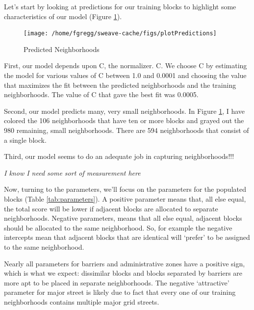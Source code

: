 \documentclass[12pt,letter]{article}\usepackage[]{graphicx}\usepackage[]{color}
\newenvironment{knitrout}{}{} %
\begin{document}
Let’s start by looking at predictions for our training blocks to
highlight some characteristics of our model (Figure
\ref{fig:predictTraining}).

\begin{figure}
\begin{knitrout}
\color{fgcolor}

{\centering \texttt{[image: /home/fgregg/sweave-cache/figs/plotPredictions]} 

}



\end{knitrout}

\caption{Predicted Neighborhoods}
\label{fig:predictTraining}
\end{figure}

First, our model depends upon C, the normalizer.  C. We choose C by
estimating the model for various values of C between 1.0 and 0.0001
and choosing the value that maximizes the fit between the predicted
neighborhoods and the training neighborhoods. The value of C that gave
the best fit was 0.0005.

Second, our model predicts many, very small neighborhoods. In Figure
\ref{fig:predictTraining}, I have colored the
106 neighborhoods that have ten or more
blocks and grayed out the 980 remaining,
small neighborhoods. There are 594
neighborhoods that consist of a single block.

Third, our model seems to do an adequate job in capturing neighborhoods!!!

\emph{I know I need some sort of measurement here}

Now, turning to the parameters, we'll focus on the parameters for the
populated blocks (Table \ref{tab:parameters}). A positive parameter
means that, all else equal, the total score will be lower if adjacent
blocks are allocated to separate neighborhoods. Negative parameters,
means that all else equal, adjacent blocks should be allocated to the
same neighborhood. So, for example the negative intercepts mean that
adjacent blocks that are identical will ‘prefer’ to be assigned to the
same neighborhood.

Nearly all parameters for barriers and administrative zones have a
positive sign, which is what we expect: dissimilar blocks and blocks
separated by barriers are more apt to be placed in separate
neighborhoods. The negative `attractive' parameter for major street is
likely due to fact that every one of our training neighborhoods
contains multiple major grid streets.
\end{document}
